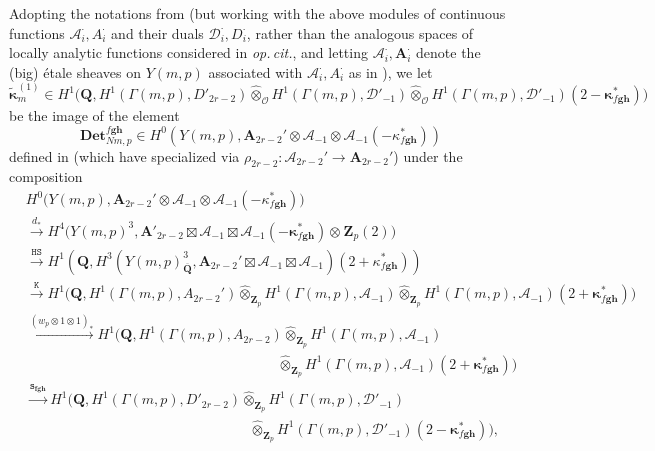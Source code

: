 \documentclass[10pt,letterpaper]{amsart}
\theoremstyle{plain}
\theoremstyle{definition}
\theoremstyle{definition}
\theoremstyle{plain}
\theoremstyle{plain}
\theoremstyle{plain}
\theoremstyle{remark}
\numberwithin{equation}{section}
\DeclareMathOperator{\et}{\acute{e}t}
\def\cA{{\mathcal A}}  %
\def\cO{\mathcal O}
\newcommand{\Q}{\mathbf{Q}}
\newcommand{\Z}{\mathbf{Z}}
\newcommand{\bff}{{\boldsymbol{f}}}
\newcommand{\bfg}{{\boldsymbol{g}}}
\newcommand{\bfh}{{\boldsymbol{h}}}
\begin{document}
Adopting the notations from \cite{BSV} (but working with the above modules of continuous functions $\mathcal{A}_i^\cdot,A_i^\cdot$ and their duals $\mathcal{D}_i^\cdot,D_i^\cdot$, rather than the analogous spaces of locally analytic functions considered in \emph{op.\,cit.}, and letting $\boldsymbol{\mathcal{A}}_i^\cdot,\boldsymbol{A}_i^\cdot$ denote the (big)  \'etale sheaves on $Y(m,p)$ associated with $\mathcal{A}_i^\cdot,A_i^\cdot$ as in \cite[\S{5.3},\S5.6]{ACR}), we let
\begin{equation}\label{eq:wrong-big-1}
\tilde{\boldsymbol{\kappa}}_m^{(1)}\in H^1\bigl(\Q,H^1(\Gamma(m,p),D'_{2r-2})\hat\otimes_\cO H^1(\Gamma(m,p),\mathcal{D}'_{-1})\hat\otimes_\cO H^1(\Gamma(m,p),\mathcal{D}'_{-1})(2-\boldsymbol{\kappa}_{f\bfg\bfh}^*)\bigr)
\end{equation}
be the image of the element 
\[
\textbf{Det}_{Nm,p}^{f\bfg\bfh}\in H^0_{\et}(Y(m,p),\boldsymbol{A}_{2r-2}'\otimes\boldsymbol{\mathcal{A}}_{-1}\otimes\boldsymbol{\mathcal{A}}_{-1}(-\kappa_{f\bfg\bfh}^*))
\]
defined in \cite[\S{8.1}]{BSV} (which have specialized via $\rho_{2r-2}:\boldsymbol{\mathcal{A}}_{2r-2}'\rightarrow\boldsymbol{A}_{2r-2}'$) under the composition
\begin{align*}
&H^0_{\et}\bigl(Y(m,p),\boldsymbol{A}_{2r-2}'\otimes\boldsymbol{\cA}_{-1}\otimes\boldsymbol{\cA}_{-1}(-\kappa_{f\bfg\bfh}^*)\bigr)\\
&\overset{d_*}\longrightarrow H_{\et}^4\bigl(Y(m,p)^3,\boldsymbol{A}'_{2r-2}\boxtimes\boldsymbol{\cA}_{-1}\boxtimes\boldsymbol{\cA}_{-1}(-\boldsymbol{\kappa}_{f\bfg\bfh}^*)\otimes_{}\Z_p(2)\bigr)\\
&\overset{\mathtt{HS}}\longrightarrow H^1(\Q,H^3_{\et}(Y(m,p)_{\overline{\Q}}^3,\boldsymbol{A}_{2r-2}'\boxtimes\boldsymbol{\cA}_{-1}\boxtimes\boldsymbol{\cA}_{-1})(2+\kappa_{f\bfg\bfh}^*))\\
&\overset{\mathtt{K}}\rightarrow H^1\bigl(\Q,H^1(\Gamma(m,p),A_{2r-2}')\hat\otimes_{\Z_p} H^1(\Gamma(m,p),\cA_{-1})\hat\otimes_{\Z_p} H^1(\Gamma(m,p),\cA_{-1})(2+\boldsymbol{\kappa}_{f\bfg\bfh}^*)\bigr)\\
&\xrightarrow{(w_p\otimes 1\otimes 1)_*}
H^1\bigl(\Q,H^1(\Gamma(m,p),A_{2r-2})\hat\otimes_{\Z_p} H^1(\Gamma(m,p),\cA_{-1})\\ &\qquad\qquad\qquad\qquad\qquad\qquad\qquad\qquad\qquad\hat\otimes_{\Z_p} H^1(\Gamma(m,p),\cA_{-1})(2+\boldsymbol{\kappa}_{f\bfg\bfh}^*)\bigr)\\
&\xrightarrow{\mathtt{s}_{\bff\bfg\bfh}}
H^1\bigl(\Q,H^1(\Gamma(m,p),D'_{2r-2})\hat\otimes_{\Z_p} H^1(\Gamma(m,p),\mathcal{D}'_{-1})\\
&\qquad\qquad\qquad\qquad\qquad\qquad \qquad\qquad\hat\otimes_{\Z_p} H^1(\Gamma(m,p),\mathcal{D}'_{-1})(2-\boldsymbol{\kappa}_{f\bfg\bfh}^*)\bigr),
\end{align*}
\end{document}
